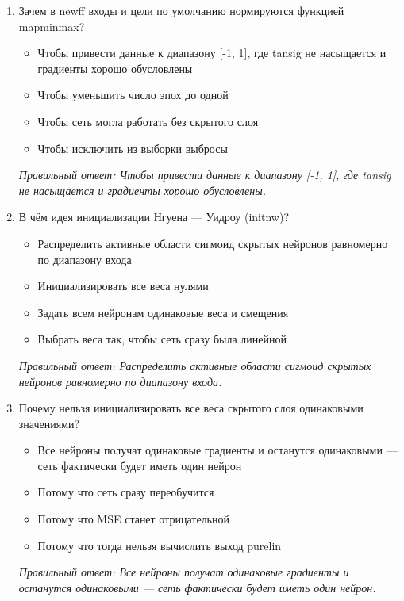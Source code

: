 \begin{enumerate}[label=\textbf{\arabic*.}, leftmargin=0pt, itemsep=1.2em]
\item Зачем в newff входы и цели по умолчанию нормируются функцией mapminmax?
\begin{itemize}[label=$\square$, leftmargin=1.5cm, itemsep=0.2em, topsep=0.3em]
\item Чтобы привести данные к диапазону [-1, 1], где tansig не насыщается и градиенты хорошо обусловлены
\item Чтобы уменьшить число эпох до одной
\item Чтобы сеть могла работать без скрытого слоя
\item Чтобы исключить из выборки выбросы
\end{itemize}
{\small\textit{Правильный ответ: Чтобы привести данные к диапазону [-1, 1], где tansig не насыщается и градиенты хорошо обусловлены.}}

\item В чём идея инициализации Нгуена — Уидроу (initnw)?
\begin{itemize}[label=$\square$, leftmargin=1.5cm, itemsep=0.2em, topsep=0.3em]
\item Распределить активные области сигмоид скрытых нейронов равномерно по диапазону входа
\item Инициализировать все веса нулями
\item Задать всем нейронам одинаковые веса и смещения
\item Выбрать веса так, чтобы сеть сразу была линейной
\end{itemize}
{\small\textit{Правильный ответ: Распределить активные области сигмоид скрытых нейронов равномерно по диапазону входа.}}

\item Почему нельзя инициализировать все веса скрытого слоя одинаковыми значениями?
\begin{itemize}[label=$\square$, leftmargin=1.5cm, itemsep=0.2em, topsep=0.3em]
\item Все нейроны получат одинаковые градиенты и останутся одинаковыми — сеть фактически будет иметь один нейрон
\item Потому что сеть сразу переобучится
\item Потому что MSE станет отрицательной
\item Потому что тогда нельзя вычислить выход purelin
\end{itemize}
{\small\textit{Правильный ответ: Все нейроны получат одинаковые градиенты и останутся одинаковыми — сеть фактически будет иметь один нейрон.}}


\end{enumerate}
